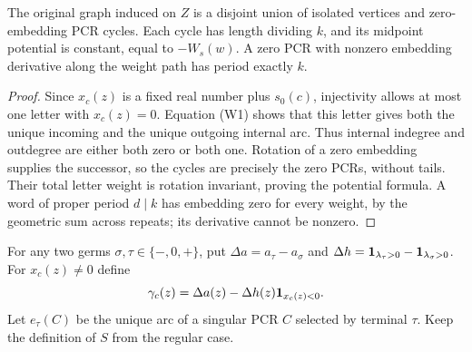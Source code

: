 \begin{lemma}\label{lem:singular-subgraph}
The original graph induced on $Z$ is a disjoint union of isolated
vertices and zero-embedding PCR cycles. Each cycle has length dividing
$k$, and its midpoint potential is constant, equal to $-W_s(w)$.
A zero PCR with nonzero embedding derivative along the weight path
has period exactly $k$.
\end{lemma}
\begin{proof}
Since $x_c(z)$ is a fixed real number plus $s_0(c)$, injectivity
allows at most one letter with $x_c(z)=0$. Equation (W1) shows that
this letter gives both the unique incoming and the unique outgoing
internal arc. Thus internal indegree and outdegree are either both
zero or both one. Rotation of a zero embedding supplies the
successor, so the cycles are precisely the zero PCRs, without tails.
Their total letter weight is rotation invariant, proving the
potential formula. A word of proper period $d\mid k$ has embedding
zero for every weight, by the geometric sum across repeats; its
derivative cannot be nonzero.
\end{proof}

For any two germs $\sigma,\tau\in\{-,0,+\}$, put
$\Delta a=a_\tau-a_\sigma$ and
$\Delta h=\mathbf 1_{\lambda_\tau>0}-\mathbf 1_{\lambda_\sigma>0}$. For
$x_c(z)\ne0$ define
\[
 \gamma_c(z)=\Delta a(z)-\Delta h(z)\mathbf 1_{x_c(z)<0}.
\]
Let $e_\tau(C)$ be the unique arc of a singular PCR $C$ selected
by terminal $\tau$. Keep the definition of $S$ from the regular case.

